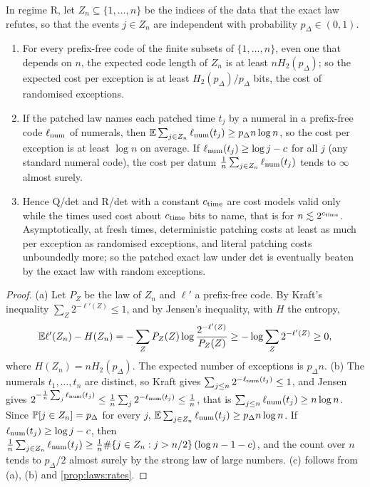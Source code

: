 \begin{proposition}\label{prop:laws:patches}
In regime R, let $Z_n\subseteq\{1,\dots,n\}$ be the indices of the data that the exact law refutes, so that the events $j\in Z_n$ are independent with probability $p_\Delta\in(0,1)$.
\begin{enumerate}[label=(\alph*),itemsep=1pt,topsep=2pt]
\item For every prefix-free code of the finite subsets of $\{1,\dots,n\}$, even one that depends on $n$, the expected code length of $Z_n$ is at least $nH_2(p_\Delta)$; so the expected cost per exception is at least $H_2(p_\Delta)/p_\Delta$ bits, the cost of randomised exceptions.
\item If the patched law names each patched time $t_j$ by a numeral in a prefix-free code $\ell_{\rm num}$ of numerals, then $\mathbb{E}\sum_{j\in Z_n}\ell_{\rm num}(t_j)\ge p_\Delta n\log n$, so the cost per exception is at least $\log n$ on average. If $\ell_{\rm num}(t_j)\ge\log j-c$ for all $j$ (any standard numeral code), the cost per datum $\frac1n\sum_{j\in Z_n}\ell_{\rm num}(t_j)$ tends to $\infty$ almost surely.
\item Hence Q/det and R/det with a constant $c_{\rm time}$ are cost models valid only while the times used cost about $c_{\rm time}$ bits to name, that is for $n\lesssim2^{c_{\rm time}}$. Asymptotically, at fresh times, deterministic patching costs at least as much per exception as randomised exceptions, and literal patching costs unboundedly more; so the patched exact law under det is eventually beaten by the exact law with random exceptions.
\end{enumerate}
\end{proposition}

\begin{proof}
(a) Let $P_Z$ be the law of $Z_n$ and $\ell'$ a prefix-free code. By Kraft's inequality $\sum_Z2^{-\ell'(Z)}\le1$, and by Jensen's inequality, with $H$ the entropy,
\[\mathbb{E}\ell'(Z_n)-H(Z_n)=-\sum_ZP_Z(Z)\log\frac{2^{-\ell'(Z)}}{P_Z(Z)}\ge-\log\sum_Z2^{-\ell'(Z)}\ge0,\]
where $H(Z_n)=nH_2(p_\Delta)$. The expected number of exceptions is $p_\Delta n$. (b) The numerals $t_1,\dots,t_n$ are distinct, so Kraft gives $\sum_{j\le n}2^{-\ell_{\rm num}(t_j)}\le1$, and Jensen gives $2^{-\frac1n\sum_j\ell_{\rm num}(t_j)}\le\frac1n\sum_j2^{-\ell_{\rm num}(t_j)}\le\frac1n$, that is $\sum_{j\le n}\ell_{\rm num}(t_j)\ge n\log n$. Since $\mathbb{P}[j\in Z_n]=p_\Delta$ for every $j$, $\mathbb{E}\sum_{j\in Z_n}\ell_{\rm num}(t_j)\ge p_\Delta n\log n$. If $\ell_{\rm num}(t_j)\ge\log j-c$, then $\frac1n\sum_{j\in Z_n}\ell_{\rm num}(t_j)\ge\frac1n\#\{j\in Z_n:j>n/2\}\,(\log n-1-c)$, and the count over $n$ tends to $p_\Delta/2$ almost surely by the strong law of large numbers. (c) follows from (a), (b) and \cref{prop:laws:rates}.
\end{proof}

